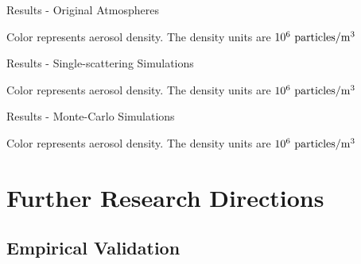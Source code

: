 \documentclass[compress,red,12pt]{beamer}
\begin{document}

\begin{frame}{Results - Original Atmospheres}
  \begin{center}
    \centerline{\def\svgwidth{1.15\linewidth}\footnotesize{}}
  \end{center}
  \begin{center}
    \tiny{Color represents aerosol density. The density units are $10^{6}~{\rm particles}/{\rm m}^3$}
  \end{center}
\end{frame}


\begin{frame}{Results - Single-scattering Simulations}
  \begin{center}
    \centerline{\def\svgwidth{1.15\linewidth}\footnotesize{}}
  \end{center}
  \begin{center}
    \tiny{Color represents aerosol density. The density units are $10^{6}~{\rm particles}/{\rm m}^3$}
  \end{center}
\end{frame}


\begin{frame}{Results - Monte-Carlo Simulations}
  \begin{center}
    \centerline{\def\svgwidth{1.15\linewidth}\footnotesize{}}
  \end{center}
  \begin{center}
    \tiny{Color represents aerosol density. The density units are $10^{6}~{\rm particles}/{\rm m}^3$}
  \end{center}
\end{frame}


\section{Further Research Directions}


\subsection{Empirical Validation}
\end{document}
